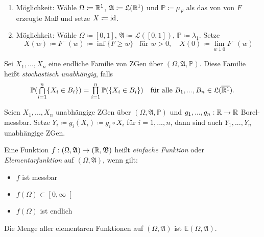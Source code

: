 \documentclass{cheat-sheet}
\newcommand{\Alg}{\mathfrak{A}} %
\newcommand{\LebAlg}{\mathfrak{L}} %
\renewcommand{\P}{\mathbb{P}} %
\newcommand{\E}{\mathbb{E}} %
\newcommand{\Bor}{\mathfrak{B}} %
\newcommand{\Leb}{\mathcal{L}} %
\renewcommand{\ER}{\overline{\R^1}} %
\begin{document}
\begin{beweis}
  \begin{enumerate}
    \item Möglichkeit: Wähle $\Omega \coloneqq \mathbb{R}^1$, $\Alg \coloneqq \LebAlg(\R^1)$ und $\P \coloneqq \mu_F$ als das von von $F$ erzeugte Maß und setze $X \coloneqq \mathrm{id}$.
    \item Möglichkeit: Wähle $\Omega \coloneqq [0,1]$, $\Alg \coloneqq \Leb([0,1])$, $\P \coloneqq \lambda_1$. Setze
    \[
      X(w) \coloneqq F^{-}(w) \coloneqq \inf \{ F \geq w \} \enspace \text{ für } w > 0, \quad
      X(0) \coloneqq \lim_{w \downarrow 0} F^{-}(w)
    \]
  \end{enumerate}
\end{beweis}




\begin{defn}
  Sei $X_1, ..., X_n$ eine endliche Familie von ZGen über $(\Omega, \Alg, \P)$. Diese Familie heißt \emph{stochastisch unabhängig}, falls
  \[ \P(\bigcap_{i=1}^n \{ X_i \in B_i \}) = \prod_{i=1}^n \P(\{ X_i \in B_i \}) \quad \text{für alle $B_1, ..., B_n \in \LebAlg(\ER)$.} \]
\end{defn}

\begin{satz}
  Seien $X_1, ..., X_n$ unabhängige ZGen über $(\Omega, \Alg, \P)$ und $g_1, ..., g_n : \mathbb{R} \to \mathbb{R}$ Borel-messbar. Setze $Y_i \coloneqq g_i(X_i) \coloneqq g_i \circ X_i$ für $i = 1, ..., n$, dann sind auch $Y_1, ..., Y_n$ unabhängige ZGen.
\end{satz}


\begin{defn}
  Eine Funktion $f : (\Omega, \Alg) \to (\R, \Bor)$ heißt \emph{einfache Funktion} oder \emph{Elementarfunktion} auf $(\Omega, \Alg)$, wenn gilt:
  \begin{multicols}{3}
    \begin{itemize}
      \item $f$ ist messbar
      \item $f(\Omega) \subset \left[0, \infty\right[$
      \item $f(\Omega)$ ist endlich
    \end{itemize}
  \end{multicols}
  Die Menge aller elementaren Funktionen auf $(\Omega, \Alg)$ ist $\E(\Omega, \Alg)$.
\end{defn}
\end{document}

